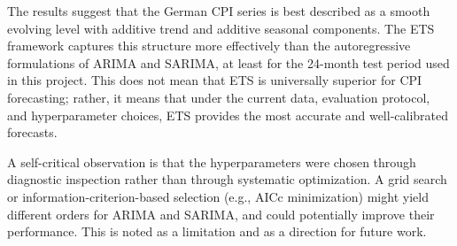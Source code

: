 The results suggest that the German CPI series is best described as a smooth evolving level with additive trend and additive seasonal components. The ETS framework captures this structure more effectively than the autoregressive formulations of ARIMA and SARIMA, at least for the 24-month test period used in this project. This does not mean that ETS is universally superior for CPI forecasting; rather, it means that under the current data, evaluation protocol, and hyperparameter choices, ETS provides the most accurate and well-calibrated forecasts.

A self-critical observation is that the hyperparameters were chosen through diagnostic inspection rather than through systematic optimization. A grid search or information-criterion-based selection (e.g., AICc minimization) might yield different orders for ARIMA and SARIMA, and could potentially improve their performance. This is noted as a limitation and as a direction for future work.
